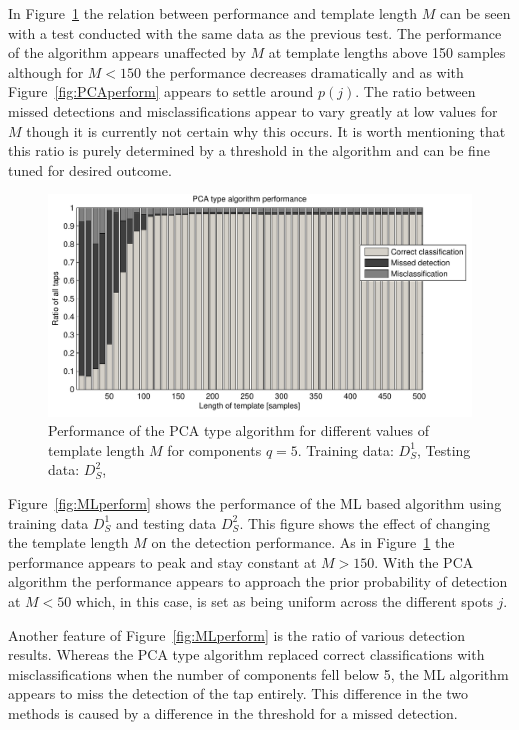 In Figure~\ref{fig:PCAperformLength} the relation between performance and template length $M$ can be seen with a test conducted with the same data as the previous test. The performance of the algorithm appears unaffected by $M$ at template lengths above 150 samples although for $M<150$ the performance decreases dramatically and as with Figure~\ref{fig:PCAperform} appears to settle around $p(j)$. The ratio between missed detections and misclassifications appear to vary greatly at low values for $M$ though it is currently not certain why this occurs. It is worth mentioning that this ratio is purely determined by a threshold in the algorithm and can be fine tuned for desired outcome.

\begin{figure}[!] %
\centering
\includegraphics[width=150mm]{PCAperformLength.pdf}
\caption{Performance of the PCA type algorithm for different values of template length $M$ for components $q=5$. Training data: $D^1_S$, Testing data: $D^2_S$,}\label{fig:PCAperformLength}
\end{figure}

Figure~\ref{fig:MLperform} shows the performance of the ML based algorithm using training data $D^1_S$ and testing data $D^2_S$. This figure shows the effect of changing the template length $M$ on the detection performance. As in Figure~\ref{fig:PCAperformLength} the performance appears to peak and stay constant at $M>150$. With the PCA algorithm the performance appears to approach the prior probability of detection at $M<50$ which, in this case, is set as being uniform across the different spots $j$.

Another feature of Figure~\ref{fig:MLperform} is the ratio of various detection results. Whereas the PCA type algorithm replaced correct classifications with misclassifications when the number of components fell below 5, the ML algorithm appears to miss the detection of the tap entirely. This difference in the two methods is caused by a difference in the threshold for a missed detection.


